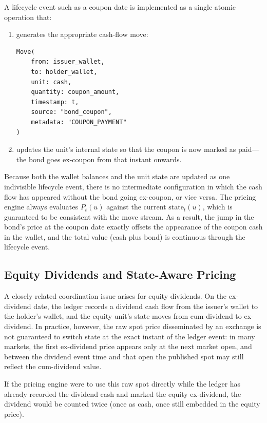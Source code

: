 \documentclass[11pt,a4paper]{article}
\begin{document}
A lifecycle event such as a coupon date is implemented as a single atomic operation that:

\begin{enumerate}
\item generates the appropriate cash-flow move:

\begin{lstlisting}
Move(
    from: issuer_wallet,
    to: holder_wallet,
    unit: cash,
    quantity: coupon_amount,
    timestamp: t,
    source: "bond_coupon",
    metadata: "COUPON_PAYMENT"
)
\end{lstlisting}

\item updates the unit's internal state so that the coupon is now marked as paid---the bond goes ex-coupon from that instant onwards.
\end{enumerate}

Because both the wallet balances and the unit state are updated as one indivisible lifecycle event, there is no intermediate configuration in which the cash flow has appeared without the bond going ex-coupon, or vice versa. The pricing engine always evaluates $P_t(u)$ against the current $\text{state}_t(u)$, which is guaranteed to be consistent with the move stream. As a result, the jump in the bond's price at the coupon date exactly offsets the appearance of the coupon cash in the wallet, and the total value (cash plus bond) is continuous through the lifecycle event.

\subsection{Equity Dividends and State-Aware Pricing}

A closely related coordination issue arises for equity dividends. On the ex-dividend date, the ledger records a dividend cash flow from the issuer's wallet to the holder's wallet, and the equity unit's state moves from cum-dividend to ex-dividend. In practice, however, the raw spot price disseminated by an exchange is not guaranteed to switch state at the exact instant of the ledger event: in many markets, the first ex-dividend price appears only at the next market open, and between the dividend event time and that open the published spot may still reflect the cum-dividend value.

If the pricing engine were to use this raw spot directly while the ledger has already recorded the dividend cash and marked the equity ex-dividend, the dividend would be counted twice (once as cash, once still embedded in the equity price).
\end{document}
